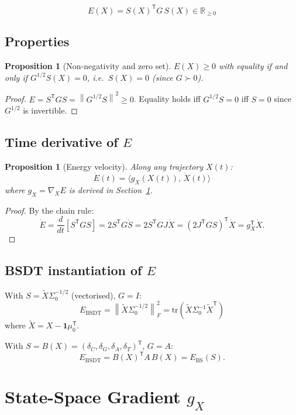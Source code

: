 \documentclass[11pt,a4paper]{article}
\newtheorem{proposition}[theorem]{Proposition}
\theoremstyle{definition}
\newcommand{\R}{\mathbb{R}}
\newcommand{\T}{^{\mathsf{T}}}
\newcommand{\norm}[1]{\left\|#1\right\|}
\newcommand{\gX}{g_X}
\newcommand{\tr}{\mathrm{tr}}
\newcommand{\bsdt}{\mathrm{BSDT}}
\begin{document}
\begin{lockedbox}
\[
E(X) = S(X)\T G\, S(X) \in \R_{\geq 0}
\]
\end{lockedbox}

\subsection{Properties}

\begin{proposition}[Non-negativity and zero set]
$E(X) \geq 0$ with equality if and only if $G^{1/2}S(X) = 0$,
i.e.\ $S(X) = 0$ (since $G \succ 0$).
\end{proposition}

\begin{proof}
$E = S\T G S = \norm{G^{1/2}S}^2 \geq 0$.
Equality holds iff $G^{1/2}S = 0$ iff $S = 0$ since $G^{1/2}$ is invertible.
\end{proof}

\subsection{Time derivative of $E$}

\begin{proposition}[Energy velocity]
Along any trajectory $X(t)$:
\[
\dot E(t) = \langle \gX(X(t)),\, \dot X(t)\rangle
\]
where $\gX = \nabla_X E$ is derived in Section~\ref{sec:gX}.
\end{proposition}

\begin{proof}
By the chain rule:
\[
\dot E = \frac{d}{dt}[S\T G S] = 2S\T G \dot S = 2S\T G J\dot X = (2J\T G S)\T \dot X = \gX\T \dot X.
\]
\end{proof}

\subsection{BSDT instantiation of $E$}

With $S = \tilde X \Sigma_0^{-1/2}$ (vectorised), $G = I$:
\[
E_\bsdt = \norm{\tilde X \Sigma_0^{-1/2}}_F^2 = \tr(\tilde X \Sigma_0^{-1} \tilde X\T)
\]
where $\tilde X = X - \mathbf{1}\mu_0\T$.

With $S = B(X) = (\delta_C,\delta_G,\delta_A,\delta_T)\T$, $G = A$:
\[
E_\bsdt = B(X)\T A\, B(X) = E_\mathrm{BS}(S).
\]

\section{State-Space Gradient $g_X$}
\label{sec:gX}
\end{document}
